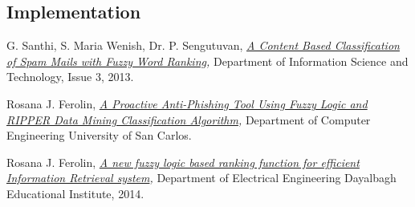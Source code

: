 \documentclass[a4paper]{article}
\begin{document}
\subsection{Implementation}

%
%
\begin{thebibliography}{9}

    G. Santhi, S. Maria Wenish, Dr. P. Sengutuvan,
    \textit{
        \href{https://github.com/Menziess/Fuzzy-Logic-Email-Classification/raw/master/report/res/a_content_based_classification_of_spam_mails_with_fuzzy_word_ranking.pdf}{A Content Based Classification of Spam Mails with Fuzzy Word Ranking},
    }
    Department of Information Science and Technology,
    Issue 3,
    2013.

    Rosana J. Ferolin,
    \textit{
        \href{https://github.com/Menziess/Fuzzy-Logic-Email-Classification/raw/master/report/res/a_proactive_anti-phishing_tool_using_fuzzy_logic_and_ripper_data_mining_classification_algorithm.pdf}{A Proactive Anti-Phishing Tool Using Fuzzy Logic and RIPPER Data Mining Classification Algorithm},
    }
    Department of Computer Engineering University of San Carlos.

    Rosana J. Ferolin,
    \textit{
        \href{https://github.com/Menziess/Fuzzy-Logic-Email-Classification/raw/master/report/res/a_new_fuzzy_logic_based_ranking_function_for_efficient_information_retrieval_system.pdf}{A new fuzzy logic based ranking function for efficient Information Retrieval system},
    }
    Department of Electrical Engineering Dayalbagh Educational Institute,
    2014.

\end{thebibliography}
\end{document}
